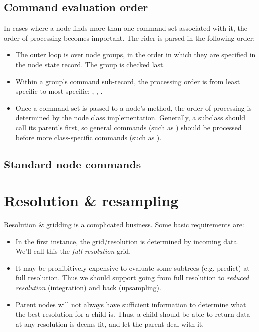 \subsection{Command evaluation order}

  In cases where a node finds more than one command set associated with it, the
  order of processing becomes important. The rider is parsed in the following
  order:

  \begin{itemize}
  
  \item The outer loop is over node groups, in the order in which they are
  specified in the node state record. The  group is checked last.
  
  \item Within a group's command sub-record, the processing order is from least
  specific to most specific: , ,
  .
  
  \item Once a command set is passed to a node's  method,
  the order of processing is determined by the node class implementation.
  Generally, a subclass should call its parent's  first,
  so general commands (such as ) should be processed before
  more class-specific commands (such as ).
  
  \end{itemize}
  
\subsection{Standard node commands}
  
\section{Resolution \& resampling}

  Resolution \& gridding is a complicated business. Some basic requirements
  are:

  \begin{itemize}
  
  \item In the first instance, the grid/resolution is determined by incoming
  data. We'll call this the {\em full resolution} grid.

  \item It may be prohibitively expensive to evaluate some subtrees (e.g.
  predict) at full resolution. Thus we should support going from full
  resolution to {\em reduced resolution} (integration) and back (upsampling). 
  
  \item Parent nodes will not always have sufficient information to determine
  what the best resolution for a child is. Thus, a child should be able to 
  return data at any resolution is deems fit, and let the parent deal with it.
  
  \end{itemize}
  

